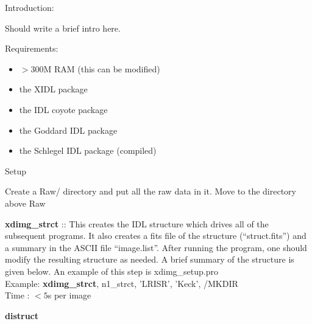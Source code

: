\documentclass[11pt,letterpaper,dvips]{article}
\begin{document}
\pagestyle{empty}
 


\begin{enumerate}

{\Large \item Introduction: }
Should write a brief intro here.


{\Large  \item Requirements:  }
	\begin{itemize}
		\item $>$300M RAM (this can be modified)
                \item the XIDL package
		\item the IDL coyote package 
		\item the Goddard IDL package
		\item the Schlegel IDL package (compiled)
	\end{itemize}

\clearpage

{\Large  \item Setup }

  \begin{Aenumerate}

    \item Create a Raw/ directory and put all the raw data in it.  Move
	to the directory above Raw

    \item {\bf xdimg\_strct} :: This creates the IDL structure which 
	drives all of the subsequent programs.  It also creates a fits file
	of the structure (``struct.fits'') and a summary in the ASCII file 
	``image.list''.  After running the program, one should 
	modify the resulting structure as needed.  A brief summary of
	the structure is given below.  An example of this step
	is xdimg\_setup.pro \\
         \quad Example: {\bf xdimg\_strct}, n1\_strct, 'LRISR', 'Keck', /MKDIR\\
         \quad Time   : $<5$s per image

    \item {\bf distruct}


\end{Aenumerate}
\end{enumerate}
\end{document}

